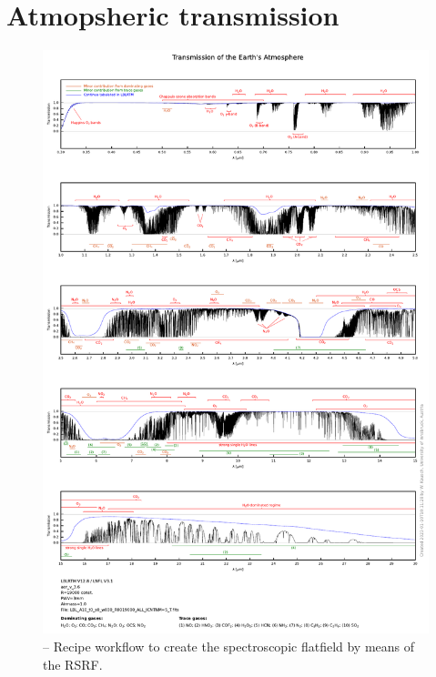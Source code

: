 % 
\section{Atmopsheric transmission}
\label{app:atmo_trans}

\begin{figure}[ht]
  \centering
  \includegraphics[width=0.7\textheight]{figures/transmission_molecs_ALL_labelled.pdf}
  \caption[Recipe: ]{ --
    Recipe workflow to create the spectroscopic flatfield by means of the \ac{RSRF}.}
  \label{Fig:rec_lm_lss_rsrf}
\end{figure}